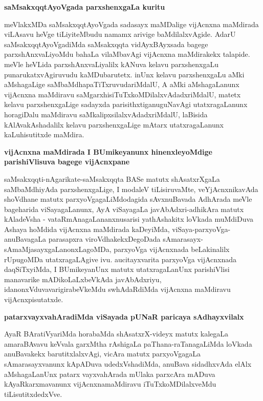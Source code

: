 {\bigskip
\noindent
{\large\bf saMsakxqqtAyoVgada parxshenxgaLa kuritu}}\label{page29}
\medskip

\noindent
meVlakxMDa saMsakxqqtAyoVgada sadasayx maMDalige vijAcnxna maMdirada viLAsavu heVge tiLiyiteMbudu \-namamx arivige baMdilalxvAgide. AdarU saMsakxqqtAyoVgadiMda saMsakxqqta vidAyxBAyxsada bagege parxshAnxvaLi\-yoMdu bahaLa vilaMbavAgi vijAcnxna maMdirakekx talapide. meVle heVLida parxshAnxvaLiyalilx kANuva kelavu parxshenx\-gaLu punarukatx\-vAgiruvudu kaMDubarutetx. inUnx kelavu parxshenx\-gaLu aMki aMshagaLige saMbaMdha\-paTiTxru\-vuda\-riMdalU, A aMki aMshagaLanunx vijAcnxna maMdiravu saMgarxhisiTuTx\break\-koMDilalxvAdadxriMdalU, matetx kelavu parxshenxgaLige sadayxda parisithxtiganuguNavAgi utatxra\-gaLanunx horagiDalu maMdiravu saMkalipxsilalxvAdadx\-riMdalU, laBisida kAlAvakAsha\-dalilx kelavu parxshenxgaLige mAtarx utatxragaLanunx kaLuhisutitxde maMdira.

{\bigskip
\noindent
{\large\bf vijAcnxna maMdirada I BUmikeyanunx hinenxleyoMdige parishiVlisuva bagege vijAcnxpane}}\label{page29}
\medskip

\noindent
saMsakxqqti-nAgarikate-saMsakxqqta BASe matutx shAsatxrXgaLa saMbaMdhiyAda parxshenxgaLige, I modaleV tiLisiru\-vaMte, veYjAcnxnikavAda shoVdhane matutx parxyoVgagaLiMdodagida sAvxnuBavada AdhArada meVle bage\-harida viSayagaLanunx, AyA viSayagaLa javA\-bAdxri-adhikAra matutx kAladeVsha - vataRmAnagaLananxnusarisi \-yathA\-shakitx loVkada muMdiDuva Ashaya hoMdida vijAcnxna maMdirada kaDeyiMda, viSaya-parxyoVga-\-anuBava\-gaLa parasapxra viroVdhakekxDegoDada sAmarasayx-sAmaMjasayxgaLanonxLagoMDa, parxyoVga vijAcnxnada beLaki\-nalilx rUpugoMDa utatxragaLAgive ivu. aucitayxvarita parxyoVga vijAcnxnada daqSiTxyiMda, I BUmike\-yanUnx matutx utatxragaLanUnx pari\-shiVlisi manavarike mADikoLaLxbeVkAda javAbAdxriyu, idanonxVdu\-vavari\-gira\break\-beVkeMdu swhAdaRdiMda vijAcnxna maMdiravu vijAcnxpisutatxde.

{\bigskip
\noindent
{\large\bf patarxvayxvahAradiMda viSayada pUNaR paricaya sAdhayxvilalx}}\label{page30}
\medskip

\noindent
AyaR BAratiVyariMda horabaMda shAsatxrX-videyx matutx kalegaLa amaraBAvavu keVvala garxMtha rAshi\-gaLa paThana-raTanagaLiMda loVkada anuBavakekx barutitxlalxvAgi, vicAra matutx parxyoVgagaLa sAma\-rasayx\-vanunx kApA\-Duva udedxVshadiMda, anuBava sidadhxvAda elAlx aMshagaLanUnx patarx vayxvahArada mUlaka parxcAra \-mADuva kAyaRkarxmavanunx vijAcnxnamaMdiravu iTuTxkoMDilalxveMdu tiLisutitxdedxVve.

